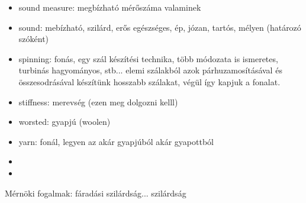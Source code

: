 \begin{itemize}
\item sound measure: megbízható mérőszáma valaminek
\item sound: mebízható, szilárd, erős egészséges, ép, józan, tartós, mélyen (határozó szóként)
\item spinning: fonás, egy szál készítési technika, több módozata is ismeretes, turbinás hagyományos, stb... elemi szálakból azok párhuzamosításával
és összesodrásával készítünk hosszabb szálakat, végül így kapjuk a fonalat.
\item stiffness: merevség (ezen meg dolgozni kelll)
\item worsted: gyapjú (woolen)
\item yarn: fonál, legyen az akár gyapjúból akár gyapottból

\item 
\item 
\end{itemize}


Mérnöki fogalmak: fáradási szilárdság...
szilárdság
